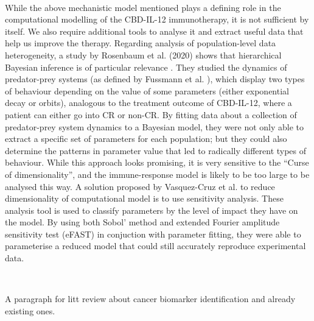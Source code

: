 \documentclass[11pt]{article}
\begin{document}
~ %
\par While the above mechanistic model mentioned plays a defining role in the computational modelling of the CBD-IL-12 immunotherapy, it is not sufficient by itself. We also require additional tools to analyse it and extract useful data that help us improve the therapy. Regarding analysis of population-level data heterogeneity, a study by Rosenbaum et al. (2020) shows that hierarchical Bayesian inference is of particular relevance \cite{rosenbaum}. They studied the dynamics of predator-prey systems (as defined by Fussmann et al. \cite{fussmann}), which display two types of behaviour depending on the value of some parameters (either exponential decay or orbits), analogous to the treatment outcome of CBD-IL-12, where a patient can either go into CR or non-CR. By fitting data about a collection of predator-prey system dynamics to a Bayesian model, they were not only able to extract a specific set of parameters for each population; but they could also determine the patterns in parameter value that led to radically different types of behaviour. While this approach looks promising, it is very sensitive to the ``Curse of dimensionality'', and the immune-response model is likely to be too large to be analysed this way. A solution proposed by Vasquez-Cruz et al. \cite{tomgro} to reduce dimensionality of computational model is to use sensitivity analysis. These analysis tool is used to classify parameters by the level of impact they have on the model. By using both Sobol' method and extended Fourier amplitude sensitivity test (eFAST) in conjuction with parameter fitting, they were able to parameterise a reduced model that could still accurately reproduce experimental data.

~ %
\par A paragraph for litt review about cancer biomarker identification and already existing ones.

\par  
\end{document}
